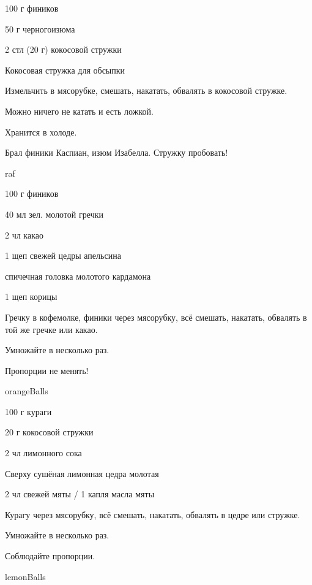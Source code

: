 {
\item 100 г фиников

\item 50 г черногоизюма
\item 2 стл (20 г) кокосовой стружки 
\item Кокосовая стружка для обсыпки
}{
\item[]
    }{
Измельчить в мясорубке, смешать, накатать, обвалять в кокосовой стружке.  
}{
\begin{advice}
\item Можно ничего не катать и есть ложкой.
    \item Хранится в холоде.
        \item Брал финики Каспиан, изюм Изабелла. Стружку пробовать!

\end{advice}
}{raf}





{
\item 100 г фиников
\item 40 мл зел. молотой гречки 
\item 2 чл какао
}{
\item 1 щеп свежей цедры апельсина
\item спичечная головка молотого кардамона
\item 1 щеп корицы
}{
Гречку в кофемолке, финики через мясорубку, всё смешать, накатать, обвалять в той же гречке или какао.
 
}{
\begin{advice}
\item Умножайте в несколько раз.
\item Пропорции не менять!
\end{advice}}{orangeBalls}




{
\item 100 г кураги
\item 20 г кокосовой стружки
\item 2 чл лимонного сока
\item Сверху сушёная лимонная цедра молотая
}{
\item 2 чл свежей мяты / 1 капля масла мяты
}{
Курагу через мясорубку, всё смешать, накатать, обвалять в цедре или стружке. 
}{
\begin{advice}
\item Умножайте в несколько раз.
\item Соблюдайте пропорции.
\end{advice}}{lemonBalls}







